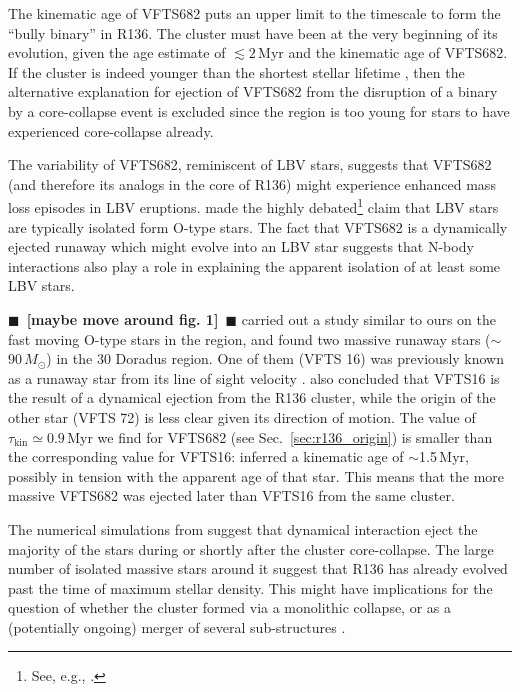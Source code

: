 \documentclass[apjl,twocolumn]{emulateapj}
\newcommand{\todo}[1]{{\large $\blacksquare$~\textbf{\color{red}[#1]}}~$\blacksquare$}
\DeclareRobustCommand{\Secref}[1]{Sec.~\ref{#1}}
\begin{document}
The kinematic age of VFTS682 puts an
upper limit to the timescale to form the ``bully binary'' in
R136. The cluster must have been at the very beginning of its
evolution, given the age estimate of $\lesssim 2$\,Myr
\citep[][]{crowther:10,sabbi:12} and the kinematic age of VFTS682. If the
cluster is indeed younger than the shortest stellar lifetime
\citep[$\sim$3\,Myr, e.g.,][]{brott:11, zapartas:17}, then the alternative
explanation for ejection of VFTS682 from the disruption of a binary
by a core-collapse event is excluded since the region is too young for stars
to have experienced core-collapse already.

The variability of VFTS682, reminiscent of LBV stars, suggests
that VFTS682 (and therefore its analogs in the core of R136) might
experience enhanced mass loss episodes in LBV eruptions. \citet{smith:15} made the highly
debated\footnote{See, e.g., \cite{humphreys:16, davidson:16, smith:16}.}
claim that LBV stars are typically isolated form O-type stars. The fact that VFTS682 is a dynamically
ejected runaway which might evolve into an LBV star suggests that
N-body interactions also play a role in explaining the apparent
isolation of at least some LBV stars. 

\todo{maybe move around fig. 1}
\citet{lennon:18} carried out a study similar to ours on the fast
moving O-type stars
in the region, and found two massive runaway stars
($\sim$$90\,M_\odot$) in the 30 Doradus region. One of them (VFTS 16)
was previously known as a runaway star from its line of sight velocity
\citep[][]{evans:10}. \citet{lennon:18} also concluded that VFTS16 is 
the result of a dynamical ejection from the R136 cluster, while the
origin of the other star (VFTS 72) is less clear given its direction
of motion. The value of $\tau_\mathrm{kin}\simeq0.9$\,Myr we find for
VFTS682 (see \Secref{sec:r136_origin}) is smaller than the
corresponding value for VFTS16: \cite{lennon:18} inferred a kinematic
age of $\sim$1.5\,Myr, possibly in tension with the apparent age of that star. This means that the more
massive VFTS682 was ejected later than VFTS16 from the same cluster.

The numerical simulations from \cite{oh:16} suggest that dynamical
interaction eject the majority of the stars during or shortly after the cluster
core-collapse. The large number of isolated massive stars around it
suggest that R136 has already evolved past the
time of maximum stellar density. This might have implications for the
question of whether the cluster formed via a monolithic collapse, or
as a (potentially ongoing) merger of several sub-structures \citep[e.g.,][]{sabbi:12}.
\end{document}
